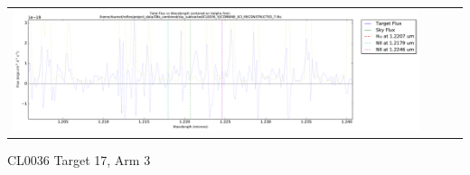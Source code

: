 \documentclass[10pt,letterpaper]{article}
\begin{document}
\begin{table}[h!]
\begin{center}
\begin{tabular}{ >{\centering\arraybackslash}m{2.5in} >{\centering\arraybackslash}m{2.5in} >{\centering\arraybackslash}m{2.5in} >{\centering\arraybackslash}m{2.3in}}
\includegraphics[scale=0.45]{../figures/CL0036_YJ/COMBINE_SCI_RECONSTRUCTED_7_Halpha.pdf}
\end{tabular}
\end{center}
\end{table}

\newpage

CL0036 Target 17, Arm 3 \\
\end{document}
